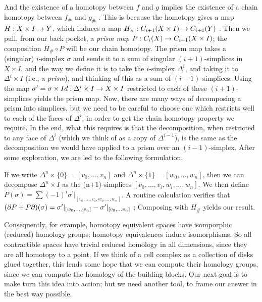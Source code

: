 And the existence of a homotopy between $f$ and $g$ implies the existence of a 
chain homotopy between $f_\#$ and $g_\#$ . This is because the homotopy 
gives a map $H:X\times I\rightarrow Y$, which induces a map $H_\#:C_{i+1}(X\times I)\rightarrow C_{i+1}(Y)$ .
Then we pull, from our back pocket, a {\it prism map}
$P:C_i(X)\rightarrow C_{i+1}(X\times I)$; the composition $H_\#\circ P$ will be our chain homotopy.
The prism map  takes a (singular) $i$-simplex $\sigma$ and sends it to a sum of singular $(i+1)$-simplices
in $X\times I$. and the way we define it is to take the $i$-simplex $\Delta^i$, and taking it 
to $\Delta^i\times I$ (i.e., a {\it prism}), and thinking of this as a sum of $(i+1)$-simplices. Using the
map $\sigma^\prime = \sigma\times Id : \Delta^i\times I\rightarrow X\times I$ 
restricted to each of these $(i+1)$-simplices
yields the prism map. Now, there are many ways of decomposing a prism into simplices,
but we need to be careful to choose one which restricts well to each of 
the \u{faces} of $\Delta^i$,
in order to get the chain homotopy property we require. In the end, what 
this requires is that the
decomposition, when restricted to any face of $\Delta^i$ (which we think of as a copy
of $\Delta^{i-1}$), is the same as the decomposition we would have applied to a prism over
an $(i-1)$-simplex. After some exploration, we are led to the following formulation.

\msk

If we write $\Delta^n\times\{0\}=[v_0,\ldots ,v_n]$ and 
$\Delta^n\times\{1\}=[w_0,\ldots ,w_n]$, then we can decompose
$\Delta^n\times I$ as the (n+1)-simplices $[v_0,\ldots ,v_i,w_i,\ldots ,w_n]$. 
We then define $P(\sigma) = \sum (-1)^i \sigma^\prime|_{[v_0,\ldots ,v_i,w_i,\ldots ,w_n]}$.
A routine calculation verifies that 
$(\partial P+P\partial)(\sigma) = \sigma^\prime|_{[w_0,\ldots ,w_n]}-\sigma^\prime|_{[v_0,\ldots v_n]}$ ;
Composing with $H_{\#}$ yields our result.

\msk

Consequently, for example, homotopy equivalent spaces have isomporphic
(reduced) homology groups; homotopy equivalences induce isomorphisms.
So all contractible spaces have trivial reduced homology
in all dimensions, since they are all homotopy to a point. If we think of a cell complex as
a collection of disks glued together, this lends some hope that we can compute
their homology groups, since we can compute the homology of the building blocks. 
Our next goal is to make turn this idea into action; but we need another tool, to
frame our answer in the best way possible.

